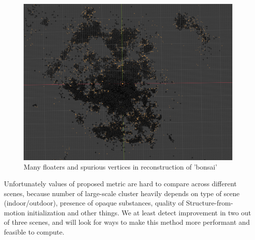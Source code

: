 \begin{figure}
    \centering
    \includegraphics[width=\textwidth]{images/gaussian/Screenshot 2024-06-04 at 03.08.28.png}
    \caption{Many floaters and spurious vertices in reconstruction of 'bonsai'}
    \label{fig:train}
\end{figure}
Unfortunately values of proposed metric are hard to compare across different scenes, because number of large-scale cluster heavily depends on type of scene (indoor/outdoor), presence of opaque substances, quality of Structure-from-motion initialization and other things. We at least detect improvement in two out of three scenes, and will look for ways to make this method more performant and feasible to compute.

